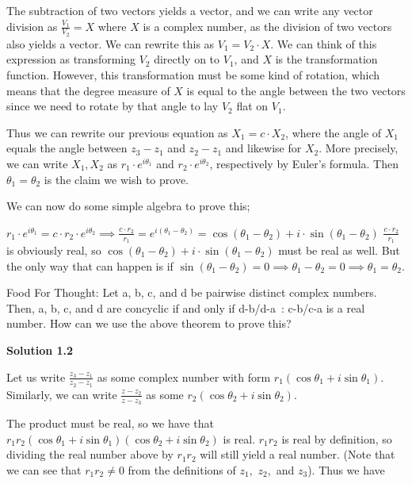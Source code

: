 \begin{enumerate}
 The subtraction of two vectors yields a vector, and we can write any vector division as $\frac{V_1}{V_2}= X$ where $X$ is a complex number, as the division of two vectors also yields a vector. We can rewrite this as $V_1 = V_2 \cdot X$. We can think of this expression as transforming $V_2$ directly on to $V_1$, and $X$ is the transformation function. However, this transformation must be some kind of rotation, which means that the degree measure of $X$ is equal to the angle between the two vectors since we need to rotate by that angle to lay $V_2$ flat on $V_1$.

 Thus we can rewrite our previous equation as $X_1 = c \cdot X_2$, where the angle of $X_1$ equals the angle between $z_3-z_1$ and $z_2-z_1$ and likewise for $X_2$. More precisely, we can write $X_1, X_2$ as $r_1 \cdot e^{i \theta_1}$ and $r_2 \cdot e^{i\theta_2}$, respectively by Euler’s formula. Then $\theta_1= \theta_2$ is the claim we wish to prove.

 We can now do some simple algebra to prove this;  

 $r_1 \cdot e^{i \theta_1} = c \cdot r_2 \cdot e^{i\theta_2} \implies \frac{c \cdot r_2}{r_1} = e^{i(\theta_1-\theta_2)} = \cos{(\theta_1-\theta_2)} + i \cdot \sin{(\theta_1-\theta_2)}$
$\frac{c \cdot r_2}{r_1}$ is obviously real, so $\cos{(\theta_1-\theta_2)} + i \cdot \sin{(\theta_1-\theta_2)}$ must be real as well. But the only way that can happen is if $\sin{(\theta_1-\theta_2)} = 0 \implies \theta_1-\theta_2 = 0 \implies \boxed{\theta_1 = \theta_2}$.

 Food For Thought: Let a, b, c, and d be pairwise distinct complex numbers. Then, a, b, c, and d are concyclic if and only if d-b/d-a : c-b/c-a  is a real number. How can we use the above theorem to prove this?

 



\textbf{Solution 1.2}

Let us write $\frac{z_3 - z_1}{z_2 - z_1}$ as some complex number with form $r_1 (\cos \theta_1 + i \sin \theta_1).$ Similarly, we can write $\frac{z-z_2}{z-z_3}$ as some $r_2 (\cos \theta_2 + i \sin \theta_2).$

 The product must be real, so we have that $r_1 r_2 (\cos \theta_1 + i \sin \theta_1) (\cos \theta_2 + i \sin \theta_2)$ is real. $r_1 r_2$ is real by definition, so dividing the real number above by $r_1 r_2$ will still yield a real number. (Note that we can see that $r_1 r_2 \not= 0$ from the definitions of $z_1,$ $z_2,$ and $z_3$). Thus we have 


\end{enumerate}
